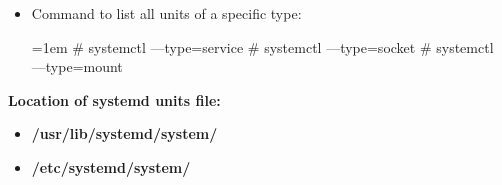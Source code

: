 \begin{flushleft}
\begin{itemize}
		\item Command to list all units of a specific type:		
		\begin{tcolorbox}[breakable,notitle,boxrule=1pt,colback=black,colframe=black]
			\color{green}
			\font=1em
			\# systemctl ---type=service
			\newline
			\# systemctl ---type=socket
			\newline
			\# systemctl ---type=mount
			\font=4pt
		\end{tcolorbox}
		
	\end{itemize}
		

	\newpage
	

	\textbf{Location of systemd units file:}
	\begin{itemize}
		\item \textbf{/usr/lib/systemd/system/}
		\item \textbf{/etc/systemd/system/}
	\end{itemize}
	

\end{flushleft}
